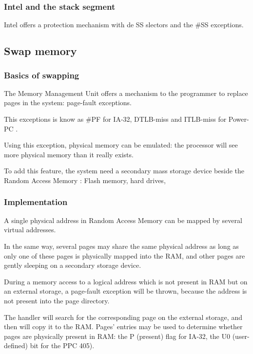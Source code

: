 
\begin{frame}
  \frametitle{Intel and the stack segment}

Intel offers a protection mechanism with de SS slectors and the \#SS exceptions.

\end{frame}


\subsection{Swap memory}

\begin{frame}
  \frametitle{Basics of swapping}

The Memory Management Unit offers a mechanism to the programmer to replace pages in the system: page-fault exceptions.

\-

This exceptions is know as \#PF for IA-32, DTLB-miss and ITLB-miss for Power-PC \etc{}.

\-

 Using this exception, physical memory can be emulated: the processor will see more physical memory than it really exists.

\-

To add this feature, the system need a secondary mass storage device beside the Random Access Memory : Flash memory, hard drives, \etc{}

\end{frame}


\begin{frame}
  \frametitle{Implementation}

A single physical address in Random Access Memory can be mapped by several virtual addresses.

\-

In the same way, several pages may share the same physical address as long as only one of these pages is physically mapped into the RAM, and other pages are gently sleeping on a secondary storage device.

\-

During a memory access to a logical address which is not present in RAM but on an external storage, a page-fault exception will be thrown, because the address is not present into the page directory.

\-

The handler will search for the corresponding page on the external storage, and then will copy it to the RAM. Pages' entries may be used to determine whether pages are physically present in RAM: the P (present) flag for IA-32, the U0 (user-defined) bit for the PPC 405).

\end{frame}

